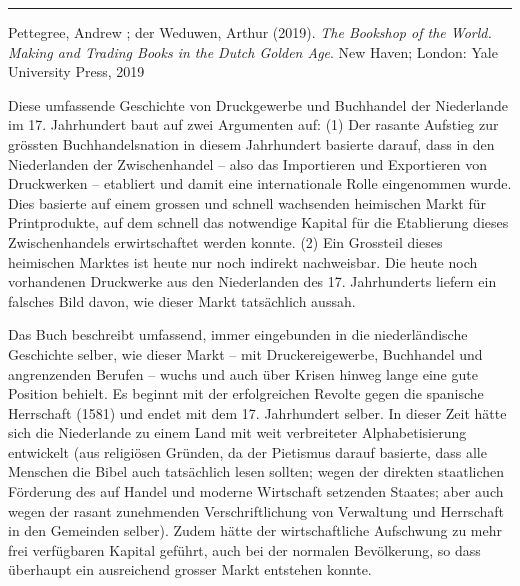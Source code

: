 \documentclass[a4paper,
fontsize=11pt,
oneside,
numbers=noperiodatend,
parskip=half-,
bibliography=totoc,
final
]{scrartcl}
\begin{document}
\begin{center}\rule{0.5\linewidth}{0.5pt}\end{center}

Pettegree, Andrew ; der Weduwen, Arthur (2019). \emph{The Bookshop of
the World. Making and Trading Books in the Dutch Golden Age}. New Haven;
London: Yale University Press, 2019

Diese umfassende Geschichte von Druckgewerbe und Buchhandel der
Niederlande im 17. Jahrhundert baut auf zwei Argumenten auf: (1) Der
rasante Aufstieg zur grössten Buchhandelsnation in diesem Jahrhundert
basierte darauf, dass in den Niederlanden der Zwischenhandel -- also das
Importieren und Exportieren von Druckwerken -- etabliert und damit eine
internationale Rolle eingenommen wurde. Dies basierte auf einem grossen
und schnell wachsenden heimischen Markt für Printprodukte, auf dem
schnell das notwendige Kapital für die Etablierung dieses
Zwischenhandels erwirtschaftet werden konnte. (2) Ein Grossteil dieses
heimischen Marktes ist heute nur noch indirekt nachweisbar. Die heute
noch vorhandenen Druckwerke aus den Niederlanden des 17. Jahrhunderts
liefern ein falsches Bild davon, wie dieser Markt tatsächlich aussah.

Das Buch beschreibt umfassend, immer eingebunden in die niederländische
Geschichte selber, wie dieser Markt -- mit Druckereigewerbe, Buchhandel
und angrenzenden Berufen -- wuchs und auch über Krisen hinweg lange eine
gute Position behielt. Es beginnt mit der erfolgreichen Revolte gegen
die spanische Herrschaft (1581) und endet mit dem 17. Jahrhundert
selber. In dieser Zeit hätte sich die Niederlande zu einem Land mit weit
verbreiteter Alphabetisierung entwickelt (aus religiösen Gründen, da der
Pietismus darauf basierte, dass alle Menschen die Bibel auch tatsächlich
lesen sollten; wegen der direkten staatlichen Förderung des auf Handel
und moderne Wirtschaft setzenden Staates; aber auch wegen der rasant
zunehmenden Verschriftlichung von Verwaltung und Herrschaft in den
Gemeinden selber). Zudem hätte der wirtschaftliche Aufschwung zu mehr
frei verfügbaren Kapital geführt, auch bei der normalen Bevölkerung, so
dass überhaupt ein ausreichend grosser Markt entstehen konnte.
\end{document}
